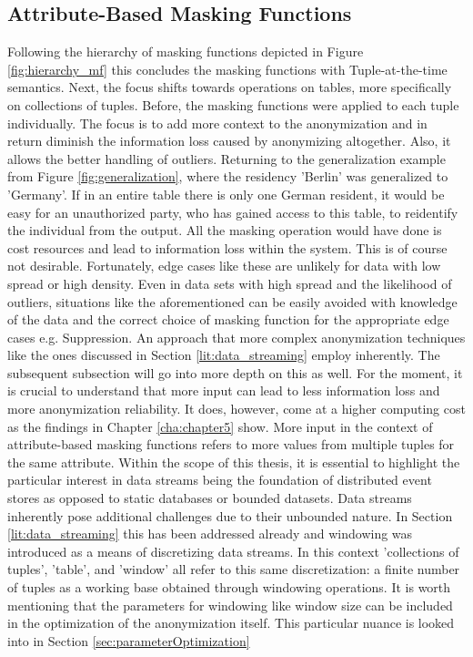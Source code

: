 \subsection{Attribute-Based Masking Functions}
Following the hierarchy of masking functions depicted in Figure \ref{fig:hierarchy_mf} this concludes the masking functions with Tuple-at-the-time semantics. Next, the focus shifts towards operations on tables, more specifically on collections of tuples. Before, the masking functions were applied to each tuple individually. The focus is to add more context to the anonymization and in return diminish the information loss caused by anonymizing altogether. Also, it allows the better handling of outliers. Returning to the generalization example from Figure \ref{fig:generalization}, where the residency 'Berlin' was generalized to 'Germany'. If in an entire table there is only one German resident, it would be easy for an unauthorized party, who has gained access to this table, to reidentify the individual from the output. All the masking operation would have done is cost resources and lead to information loss within the system. This is of course not desirable. Fortunately, edge cases like these are unlikely for data with low spread or high density. Even in data sets with high spread and the likelihood of outliers, situations like the aforementioned can be easily avoided with knowledge of the data and the correct choice of masking function for the appropriate edge cases e.g. Suppression. An approach that more complex anonymization techniques like the ones discussed in Section \ref{lit:data_streaming} employ inherently. The subsequent subsection will go into more depth on this as well. For the moment, it is crucial to understand that more input can lead to less information loss and more anonymization reliability. It does, however, come at a higher computing cost as the findings in Chapter \ref{cha:chapter5} show. More input in the context of attribute-based masking functions refers to more values from multiple tuples for the same attribute. Within the scope of this thesis, it is essential to highlight the particular interest in data streams being the foundation of distributed event stores as opposed to static databases or bounded datasets. Data streams inherently pose additional challenges due to their unbounded nature. In Section \ref{lit:data_streaming} this has been addressed already and windowing was introduced as a means of discretizing data streams. In this context 'collections of tuples', 'table', and 'window' all refer to this same discretization: a finite number of tuples as a working base obtained through windowing operations. It is worth mentioning that the parameters for windowing like window size can be included in the optimization of the anonymization itself. This particular nuance is looked into in Section \ref{sec:parameterOptimization} \par

